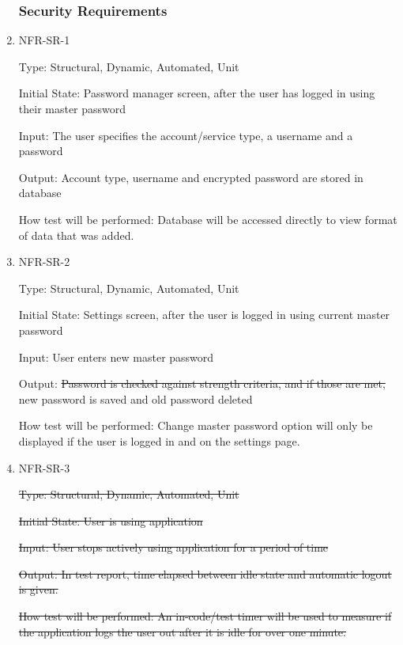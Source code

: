 \documentclass[12pt, titlepage]{article}
\begin{document}
\begin{enumerate}
\subsubsection{Security Requirements}

\item{NFR-SR-1\\}

Type: Structural, Dynamic, Automated, Unit

Initial State: Password manager screen, after the user has logged in using their master password

Input: The user specifies the account/service type, a username and a password

Output: Account type, username and encrypted password are stored in database

How test will be performed: Database will be accessed directly to view format of data that was added.
 
\item{NFR-SR-2}

Type: Structural, Dynamic, Automated, Unit

Initial State: Settings screen, after the user is logged in using current master password

Input: User enters new master password

Output: \sout{Password is checked against strength criteria, and if those are met,} new password is saved and old password deleted

How test will be performed: Change master password option will only be displayed if the user is logged in and on the settings page.

\item{NFR-SR-3}

\sout{Type: Structural, Dynamic, Automated, Unit}

\sout{Initial State: User is using application}

\sout{Input: User stops actively using application for a period of time}

\sout{Output: In test report, time elapsed between idle state and automatic logout is given.}

\sout{How test will be performed: An in-code/test timer will be used to measure if the application logs the user out after it is idle for over one minute.}

\end{enumerate}
\end{document}
